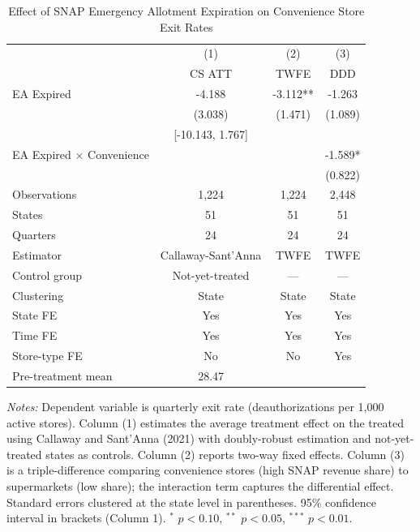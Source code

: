 \begin{table}[htbp]
\centering
\caption{Effect of SNAP Emergency Allotment Expiration on Convenience Store Exit Rates}
\label{tab:main}
\begin{tabular}{lccc}
\toprule
 & (1) & (2) & (3) \\
 & CS ATT & TWFE & DDD \\
\midrule
EA Expired & -4.188 & -3.112** & -1.263 \\
 & (3.038) & (1.471) & (1.089) \\
 & [-10.143, 1.767] & & \\
\addlinespace
EA Expired $\times$ Convenience & & & -1.589* \\
 & & & (0.822) \\
\addlinespace
\midrule
Observations & 1,224 & 1,224 & 2,448 \\
States & 51 & 51 & 51 \\
Quarters & 24 & 24 & 24 \\
Estimator & Callaway-Sant'Anna & TWFE & TWFE \\
Control group & Not-yet-treated & --- & --- \\
Clustering & State & State & State \\
State FE & Yes & Yes & Yes \\
Time FE & Yes & Yes & Yes \\
Store-type FE & No & No & Yes \\
Pre-treatment mean & 28.47 & & \\
\bottomrule
\end{tabular}
\begin{tablenotes}
\item \textit{Notes:} Dependent variable is quarterly exit rate (deauthorizations per 1,000 active stores).
Column (1) estimates the average treatment effect on the treated using Callaway and Sant'Anna (2021)
with doubly-robust estimation and not-yet-treated states as controls.
Column (2) reports two-way fixed effects.
Column (3) is a triple-difference comparing convenience stores (high SNAP revenue share)
to supermarkets (low share); the interaction term captures the differential effect.
Standard errors clustered at the state level in parentheses.
95\% confidence interval in brackets (Column 1).
$^{*}$ $p < 0.10$, $^{**}$ $p < 0.05$, $^{***}$ $p < 0.01$.
\end{tablenotes}
\end{table}
